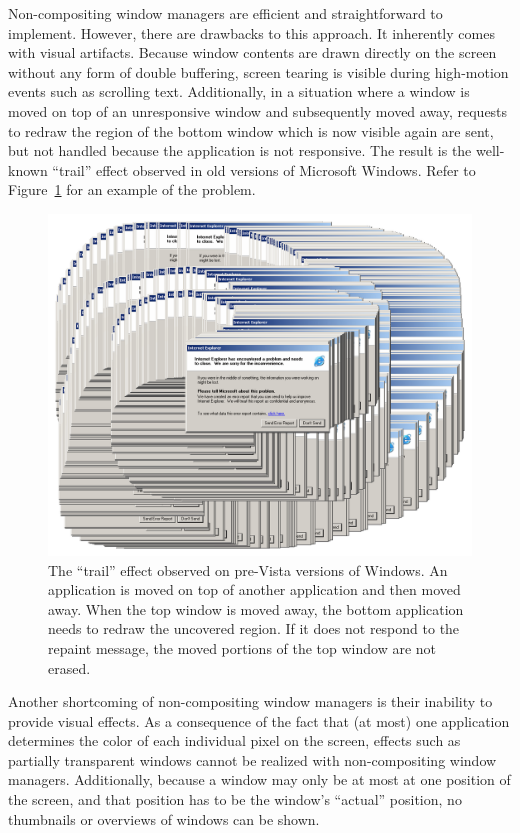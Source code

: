 			Non-compositing window managers are efficient and
			straightforward to implement. However, there are drawbacks
			to this approach. It inherently comes
			with visual artifacts. Because window contents are drawn
			directly on the screen without any form of double buffering, screen
			tearing is visible during high-motion events such as scrolling
			text. Additionally, in a situation where a window is moved on top
			of an unresponsive window and subsequently moved away, requests to
			redraw the region of the bottom window which is now visible again
			are sent, but not handled because the application is not
			responsive. The result is the well-known \enquote{trail} effect
			observed in old versions of Microsoft Windows. Refer to
			Figure~\ref{fig:trail} for an example of the problem.
			\begin{figure}[h]
				\centering
				\includegraphics[width=0.8\columnwidth]{trail}
				\caption{The \enquote{trail} effect observed on pre-Vista versions
					of Windows. An application is moved on top of another application
					and then moved away. When the top window is moved away, the bottom
					application needs to redraw the uncovered region. If it does not
					respond to the repaint message, the moved portions of the top
					window are not erased.}
				\label{fig:trail}
			\end{figure}

			Another shortcoming of non-compositing window managers is their
			inability to provide visual effects. As a consequence of the fact
			that (at most) one application determines the color of each individual
			pixel on the screen, effects such as partially transparent windows
			cannot be realized with non-compositing window managers. Additionally,
			because a window may only be at most at one position of the screen,
			and that position has to be the window's \enquote{actual} position,
			no thumbnails or overviews of windows can be shown.

